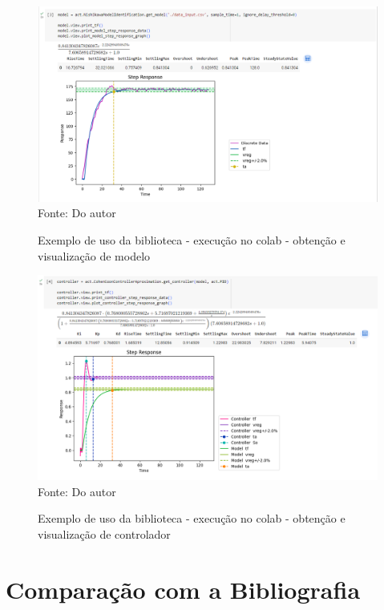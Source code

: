 \begin{figure}[H]
    \centering
    \caption{Exemplo de uso da biblioteca - execução no colab - obtenção e visualização de modelo}
    \includegraphics[scale=0.5]{figuras/colab_example2}
    \label{fig:colab_example2}
    \\
    \vspace{0cm}\hspace{0cm}\small{Fonte: Do autor}
\end{figure}

\begin{figure}[H]
    \centering
    \caption{Exemplo de uso da biblioteca - execução no colab - obtenção e visualização de controlador}
    \includegraphics[scale=0.5]{figuras/colab_example3}
    \label{fig:colab_example3}
    \\
    \vspace{0cm}\hspace{0cm}\small{Fonte: Do autor}
\end{figure}


\section{Comparação com a Bibliografia}

